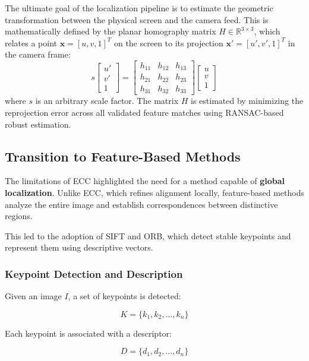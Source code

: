 \documentclass[conference]{IEEEtran}
\begin{document}
The ultimate goal of the localization pipeline is to estimate the geometric transformation between the physical screen and the camera feed. This is mathematically defined by the planar homography matrix $H \in \mathbb{R}^{3 \times 3}$, which relates a point $\mathbf{x} = [u, v, 1]^T$ on the screen to its projection $\mathbf{x}' = [u', v', 1]^T$ in the camera frame:
\begin{equation}
s \begin{bmatrix} u' \\ v' \\ 1 \end{bmatrix} = \begin{bmatrix} h_{11} & h_{12} & h_{13} \\ h_{21} & h_{22} & h_{23} \\ h_{31} & h_{32} & h_{33} \end{bmatrix} \begin{bmatrix} u \\ v \\ 1 \end{bmatrix}
\end{equation}
where $s$ is an arbitrary scale factor. The matrix $H$ is estimated by minimizing the reprojection error across all validated feature matches using RANSAC-based robust estimation.


\subsection{Transition to Feature-Based Methods}

The limitations of ECC highlighted the need for a method capable of \textbf{global localization}. Unlike ECC, which refines alignment locally, feature-based methods analyze the entire image and establish correspondences between distinctive regions.

This led to the adoption of SIFT and ORB, which detect stable keypoints and represent them using descriptive vectors.

\subsubsection{Keypoint Detection and Description}

Given an image $I$, a set of keypoints is detected:

\[
K = \{k_1, k_2, ..., k_n\}
\]

Each keypoint is associated with a descriptor:

\[
D = \{d_1, d_2, ..., d_n\}
\]
\end{document}
